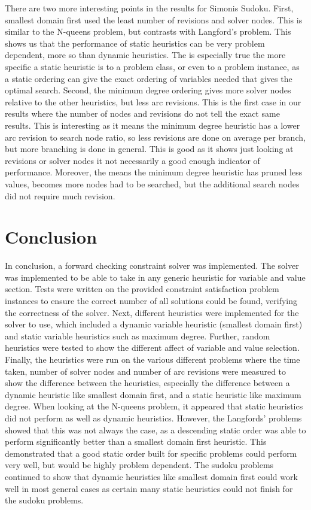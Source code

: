 \documentclass{article}
\begin{document}
There are two more interesting points in the results for Simonis Sudoku. First, smallest domain first used the least number of revisions and solver nodes. This is similar to the N-queens problem, but contrasts with Langford's problem. This shows us that the performance of static heuristics can be very problem dependent, more so than dynamic heuristics. The is especially true the more specific a static heuristic is to a problem class, or even to a problem instance, as a static ordering can give the exact ordering of variables needed that gives the optimal search. Second, the minimum degree ordering gives more solver nodes relative to the other heuristics, but less arc revisions. This is the first case in our results where the number of nodes and revisions do not tell the exact same results. This is interesting as it means the minimum degree heuristic has a lower arc revision to search node ratio, so less revisions are done on average per branch, but more branching is done in general. This is good as it shows just looking at revisions or solver nodes it not necessarily a good enough indicator of performance. Moreover, the means the minimum degree heuristic has pruned less values, becomes more nodes had to be searched, but the additional search nodes did not require much revision.

\section{Conclusion}
In conclusion, a forward checking constraint solver was implemented. The solver was implemented to be able to take in any generic heuristic for variable and value section. Tests were written on the provided constraint satisfaction problem instances to ensure the correct number of all solutions could be found, verifying the correctness of the solver. 
\n
Next, different heuristics were implemented for the solver to use, which included a dynamic variable heuristic (smallest domain first) and static variable heuristics such as maximum degree. Further, random heuristics were tested to show the different affect of variable and value selection. 
\n
Finally, the heuristics were run on the various different problems where the time taken, number of solver nodes and number of arc revisions were measured to show the difference between the heuristics, especially the difference between a dynamic heuristic like smallest domain first, and a static heuristic like maximum degree. When looking at the N-queens problem, it appeared that static heuristics did not perform as well as dynamic heuristics. However, the Langfords' problems showed that this was not always the case, as a descending static order was able to perform significantly better than a smallest domain first heuristic. This demonstrated that a good static order built for specific problems could perform very well, but would be highly problem dependent. The sudoku problems continued to show that dynamic heuristics like smallest domain first could work well in most general cases as certain many static heuristics could not finish for the sudoku problems. 
\end{document}
